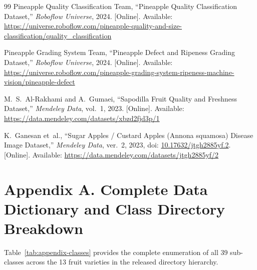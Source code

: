 \documentclass[11pt,a4paper]{article}
\begin{document}
\begin{thebibliography}{99}
Pineapple Quality Classification Team, ``Pineapple Quality Classification Dataset,'' \emph{Roboflow Universe}, 2024. [Online]. Available: \url{https://universe.roboflow.com/pineapple-quality-and-size-classification/quality_classification}

Pineapple Grading System Team, ``Pineapple Defect and Ripeness Grading Dataset,'' \emph{Roboflow Universe}, 2024. [Online]. Available: \url{https://universe.roboflow.com/pineapple-grading-system-ripeness-machine-vision/pineapple-defect}


M.~S.~Al-Rakhami and A.~Gumaei, ``Sapodilla Fruit Quality and Freshness Dataset,'' \emph{Mendeley Data}, vol.~1, 2023. [Online]. Available: \url{https://data.mendeley.com/datasets/xbzd2fjd3p/1}


K.~Ganesan et~al., ``Sugar Apples / Custard Apples (Annona squamosa) Disease Image Dataset,'' \emph{Mendeley Data}, ver.~2, 2023, doi: \href{https://doi.org/10.17632/jtgh2885yf.2}{10.17632/jtgh2885yf.2}. [Online]. Available: \url{https://data.mendeley.com/datasets/jtgh2885yf/2}

\end{thebibliography}

\section*{Appendix A. Complete Data Dictionary and Class Directory Breakdown}
Table~\ref{tab:appendix-classes} provides the complete enumeration of all 39 sub-classes across the 13 fruit varieties in the released directory hierarchy.
\end{document}
